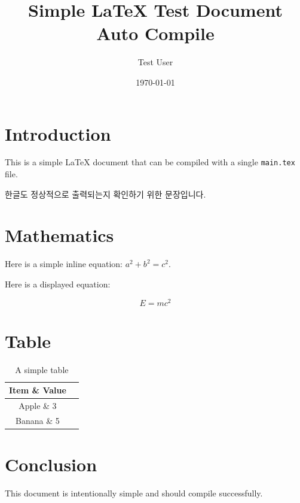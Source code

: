 \documentclass{article}
\title{Simple LaTeX Test Document Auto Compile}
\author{Test User}
\date{\today}
\begin{document}
\maketitle

\section{Introduction}

This is a simple LaTeX document that can be compiled with a single
\texttt{main.tex} file.

한글도 정상적으로 출력되는지 확인하기 위한 문장입니다.



\section{Mathematics}

Here is a simple inline equation: $a^2 + b^2 = c^2$.

Here is a displayed equation:

\[
    E = mc^2
\]

\section{Table}

\begin{table}[h]
    \centering
    \begin{tabular}{|c|c|}
        \hline
        Item \& Value \\
        \hline
        Apple \& 3 \\
        Banana \& 5 \\
        \hline
    \end{tabular}
    \caption{A simple table}
\end{table}

\section{Conclusion}

This document is intentionally simple and should compile successfully.
\end{document}
